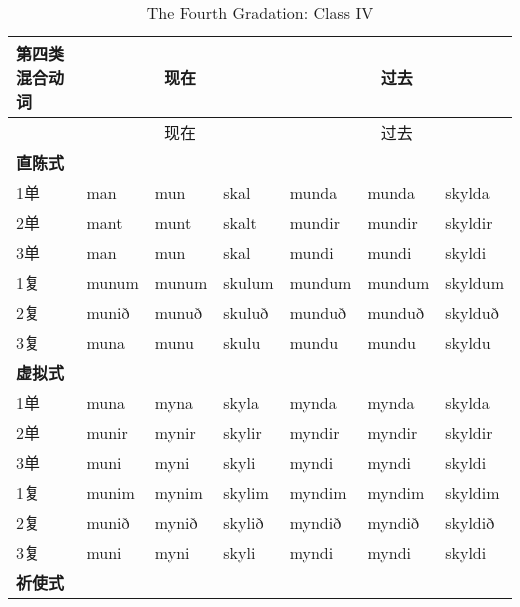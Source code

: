 \begin{longtable}{lllllll}
  \caption[The Fourth Gradation: Class IV]{The Fourth Gradation: Class
    IV}\tabularnewline
  \toprule
  第四类混合动词      & \multicolumn{3}{c}{现在} & \multicolumn{3}{c}{过去}                                        \\\midrule\endfirsthead{} &\multicolumn{3}{c}{现在} &\multicolumn{3}{c}{过去} \\
  \midrule
  \endhead
  \bottomrule
  \endfoot
  \textbf{直陈式} & ~                      & ~                      & ~        & ~      & ~      & ~       \\
  1单           & man                    & mun                    & skal     & munda  & munda  & skylda  \\
  2单           & mant                   & munt                   & skalt    & mundir & mundir & skyldir \\
  3单           & man                    & mun                    & skal     & mundi  & mundi  & skyldi  \\
  1复           & munum                  & munum                  & skulum   & mundum & mundum & skyldum \\
  2复           & munið                  & munuð                  & skuluð   & munduð & munduð & skylduð \\
  3复           & muna                   & munu                   & skulu    & mundu  & mundu  & skyldu  \\
  \textbf{虚拟式} & ~                      & ~                      & ~        & ~      & ~      & ~       \\
  1单           & muna                   & myna                   & skyla    & mynda  & mynda  & skylda  \\
  2单           & munir                  & mynir                  & skylir   & myndir & myndir & skyldir \\
  3单           & muni                   & myni                   & skyli    & myndi  & myndi  & skyldi  \\
  1复           & munim                  & mynim                  & skylim   & myndim & myndim & skyldim \\
  2复           & munið                  & mynið                  & skylið   & myndið & myndið & skyldið \\
  3复           & muni                   & myni                   & skyli    & myndi  & myndi  & skyldi  \\
  \textbf{祈使式} & ~                      & ~                      & ~        & ~      & ~      & ~       \\

\end{longtable}
